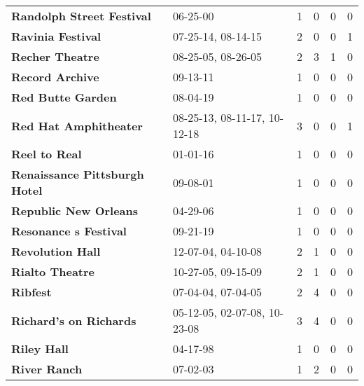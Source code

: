\begin{supertabular}{llllll}
                                    \textbf{Randolph Street Festival} &                      06-25-00 &  1 &   0 &  0 &  0 \\
                                            \textbf{Ravinia Festival} &            07-25-14, 08-14-15 &  2 &   0 &  0 &  1 \\
                                              \textbf{Recher Theatre} &            08-25-05, 08-26-05 &  2 &   3 &  1 &  0 \\
                                              \textbf{Record Archive} &                      09-13-11 &  1 &   0 &  0 &  0 \\
                                            \textbf{Red Butte Garden} &                      08-04-19 &  1 &   0 &  0 &  0 \\
                                        \textbf{Red Hat Amphitheater} &  08-25-13, 08-11-17, 10-12-18 &  3 &   0 &  0 &  1 \\
                                                \textbf{Reel to Real} &                      01-01-16 &  1 &   0 &  0 &  0 \\
                                \textbf{Renaissance Pittsburgh Hotel} &                      09-08-01 &  1 &   0 &  0 &  0 \\
                                        \textbf{Republic New Orleans} &                      04-29-06 &  1 &   0 &  0 &  0 \\
                                        \textbf{Resonance s Festival} &                      09-21-19 &  1 &   0 &  0 &  0 \\
                                             \textbf{Revolution Hall} &            12-07-04, 04-10-08 &  2 &   1 &  0 &  0 \\
                                              \textbf{Rialto Theatre} &            10-27-05, 09-15-09 &  2 &   1 &  0 &  0 \\
                                                     \textbf{Ribfest} &            07-04-04, 07-04-05 &  2 &   4 &  0 &  0 \\
                                       \textbf{Richard's on Richards} &  05-12-05, 02-07-08, 10-23-08 &  3 &   4 &  0 &  0 \\
                                                  \textbf{Riley Hall} &                      04-17-98 &  1 &   0 &  0 &  0 \\
                                                 \textbf{River Ranch} &                      07-02-03 &  1 &   2 &  0 &  0 \\

\end{supertabular}
